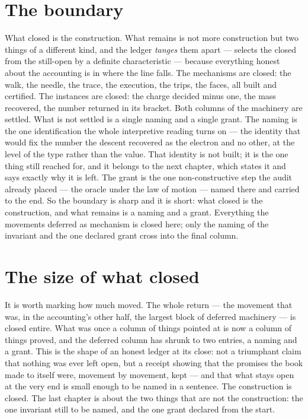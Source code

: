 \section{The boundary}
\label{se:the-boundary}

What closed is the construction. What remains is not more construction but two things of a different kind,
and the ledger \emph{tanges} them apart --- selects the closed from the still-open by a definite
characteristic --- because everything honest about the accounting is in where the line falls. The mechanisms are closed: the walk, the needle, the trace, the execution, the trips,
the faces, all built and certified. The instances are closed: the charge decided minus one, the mass
recovered, the number returned in its bracket. Both columns of the machinery are settled. What is not settled
is a single naming and a single grant. The naming is the one identification the whole interpretive reading
turns on --- the identity that would fix the number the descent recovered as the electron and no other, at
the level of the type rather than the value. That identity is not built; it is the one thing still reached
for, and it belongs to the next chapter, which states it and says exactly why it is left. The grant is the
one non-constructive step the audit already placed --- the oracle under the law of motion --- named there and
carried to the end. So the boundary is sharp and it is short: what closed is the construction, and what
remains is a naming and a grant. Everything the movements deferred as mechanism is closed here; only the
naming of the invariant and the one declared grant cross into the final column.

\section{The size of what closed}
\label{se:size-of-what-closed}

It is worth marking how much moved. The whole return --- the movement that was, in the accounting's other
half, the largest block of deferred machinery --- is closed entire. What was once a column of things pointed
at is now a column of things proved, and the deferred column has shrunk to two entries, a naming and a
grant. This is the shape of an honest ledger at its close: not a triumphant claim that nothing was ever left
open, but a receipt showing that the promises the book made to itself were, movement by movement, kept ---
and that what stays open at the very end is small enough to be named in a sentence. The construction is
closed. The last chapter is about the two things that are not the construction: the one invariant still to be
named, and the one grant declared from the start.

